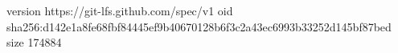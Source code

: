 version https://git-lfs.github.com/spec/v1
oid sha256:d142e1a8fe68fbf84445ef9b40670128b6f3c2a43ec6993b33252d145bf87bed
size 174884
